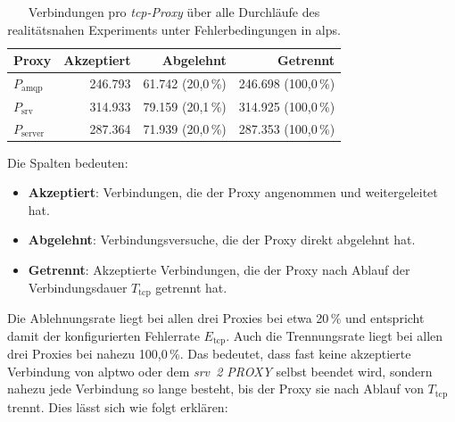 \begin{table}[H]
    \centering
    \caption{Verbindungen pro \textit{\gls{tcp}-Proxy} über alle Durchläufe des realitätsnahen Experiments unter Fehlerbedingungen in \acrshort{alps}.}
    \label{tab:exp-alps-realistic-connections}
    \begin{tabular}{|l|r|r|r|}
        \hline
        \textbf{Proxy}      & \textbf{Akzeptiert} & \textbf{Abgelehnt}  & \textbf{Getrennt}     \\
        \hline
        $P_{\text{amqp}}$   & 246.793             & 61.742 (20{,}0\,\%) & 246.698 (100{,}0\,\%) \\
        $P_{\text{srv}}$    & 314.933             & 79.159 (20{,}1\,\%) & 314.925 (100{,}0\,\%) \\
        $P_{\text{server}}$ & 287.364             & 71.939 (20{,}0\,\%) & 287.353 (100{,}0\,\%) \\
        \hline
    \end{tabular}
\end{table}

Die Spalten bedeuten:

\begin{itemize}
    \item \textbf{Akzeptiert}: Verbindungen, die der Proxy angenommen und weitergeleitet hat.
    \item \textbf{Abgelehnt}: Verbindungsversuche, die der Proxy direkt abgelehnt hat.
    \item \textbf{Getrennt}: Akzeptierte Verbindungen, die der Proxy nach Ablauf der Verbindungsdauer $T_{\text{tcp}}$ getrennt hat.
\end{itemize}

Die Ablehnungsrate liegt bei allen drei Proxies bei etwa 20\,\% und entspricht damit der konfigurierten Fehlerrate $E_{\text{tcp}}$. Auch die Trennungsrate liegt bei allen drei Proxies bei nahezu 100{,}0\,\%. Das bedeutet, dass fast keine akzeptierte Verbindung von \gls{alptwo} oder dem \textit{\gls{srv}~2 PROXY} selbst beendet wird, sondern nahezu jede Verbindung so lange besteht, bis der Proxy sie nach Ablauf von $T_{\text{tcp}}$ trennt. Dies lässt sich wie folgt erklären:

